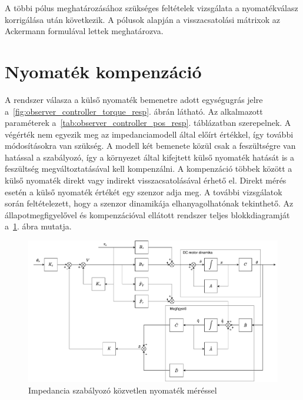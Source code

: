 A többi pólus meghatározásához szükséges feltételek vizsgálata a nyomatékválasz korrigálása után következik.
A pólusok alapján a visszacsatolási mátrixok az Ackermann formulával lettek meghatározva.

\section{Nyomaték kompenzáció}
A rendszer válasza a külső nyomaték bemenetre adott egységugrás jelre a~\ref{fig:observer_controller_torque_resp}. ábrán látható. 
Az alkalmazott paraméterek a~\ref{tab:observer_controller_pos_resp}. táblázatban szerepelnek.
A végérték nem egyezik meg az impedanciamodell által előírt értékkel, így további módosításokra van szükség.
A modell két bemenete közül csak a feszültségre van hatással a 
szabályozó, így a környezet által kifejtett külső nyomaték 
hatását is a feszültség megváltoztatásával kell kompenzálni. A kompenzáció többek között 
a külső nyomaték direkt vagy indirekt visszacsatolásával érhető el.
Direkt mérés esetén a külső nyomaték értékét egy szenzor adja meg.
A további vizsgálatok során feltételezett, hogy a szenzor dinamikája elhanyagolhatónak tekinthető. Az
állapotmegfigyelővel és kompenzációval ellátott rendszer teljes 
blokkdiagramját a~\ref{fig:block_diagram_direct_compensation}. ábra mutatja.
\begin{figure}[ht]
    \begin{center}
    \includegraphics[width=\textwidth]{images/compensated_position_control_torque.pdf}
    \caption{Impedancia szabályozó közvetlen nyomaték méréssel}\label{fig:block_diagram_direct_compensation}
    \end{center}
\end{figure}


